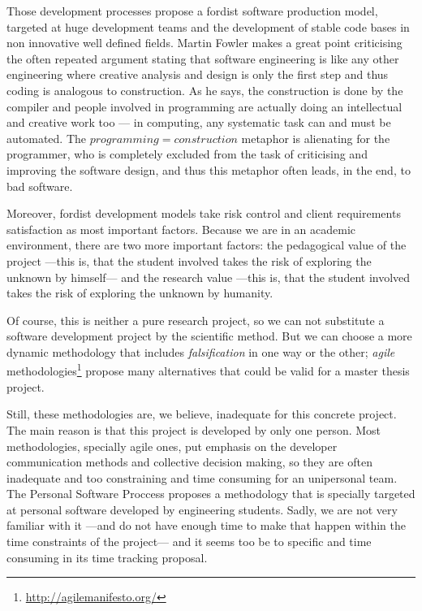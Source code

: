 Those development processes propose a fordist software production
model, targeted at huge development teams and the development of
stable code bases in non innovative well defined fields. Martin Fowler
makes a great point \cite{fowler01design} criticising the often
repeated argument stating that software engineering is like any other
engineering where creative analysis and design is only the first step
and thus coding is analogous to construction. As he says, the
construction is done by the compiler and people involved in
programming are actually doing an intellectual and creative work too
--- in computing, any systematic task can and must be automated. The
$programming=construction$ metaphor is alienating for the programmer,
who is completely excluded from the task of criticising and improving
the software design, and thus this metaphor often leads, in the end,
to bad software.

Moreover, fordist development models take risk control and client
requirements satisfaction as most important factors. Because we are in
an academic environment, there are two more important factors: the
pedagogical value of the project ---this is, that the student involved
takes the risk of exploring the unknown by himself--- and the research
value ---this is, that the student involved takes the risk of
exploring the unknown by humanity.

Of course, this is neither a pure research project, so we can not
substitute a software development project by the scientific
method. But we can choose a more dynamic methodology that includes
\emph{falsification} in one way or the other; \emph{agile}
methodologies\footnote{\url{http://agilemanifesto.org/}} propose many
alternatives that could be valid for a master thesis project.

Still, these methodologies are, we believe, inadequate for this
concrete project. The main reason is that this project is developed by
only one person. Most methodologies, specially agile ones, put
emphasis on the developer communication methods and collective
decision making, so they are often inadequate and too constraining and
time consuming for an unipersonal team.  The Personal Software
Proccess \cite{watts96psp} proposes a methodology that is specially
targeted at personal software developed by engineering
students. Sadly, we are not very familiar with it ---and do not have
enough time to make that happen within the time constraints of the
project--- and it seems too be to specific and time consuming in its
time tracking proposal.

